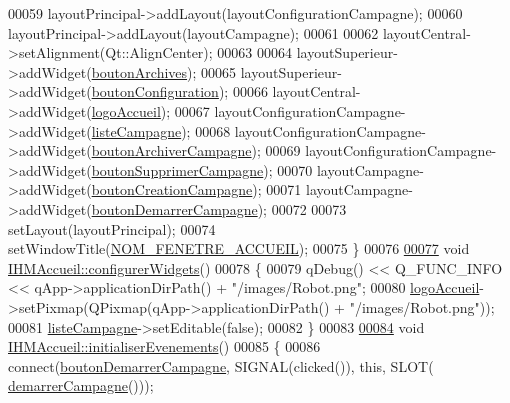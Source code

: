 \begin{DoxyCode}
00059     layoutPrincipal->addLayout(layoutConfigurationCampagne);
00060     layoutPrincipal->addLayout(layoutCampagne);
00061 
00062     layoutCentral->setAlignment(Qt::AlignCenter);
00063 
00064     layoutSuperieur->addWidget(\hyperlink{class_i_h_m_accueil_a313a8c52763aa2978010db77ec6673ac}{boutonArchives});
00065     layoutSuperieur->addWidget(\hyperlink{class_i_h_m_accueil_a8b8ed7d11ab66e3c6895b3c6129dc9c8}{boutonConfiguration});
00066     layoutCentral->addWidget(\hyperlink{class_i_h_m_accueil_a709440124f3307589eee68c517833e6d}{logoAccueil});
00067     layoutConfigurationCampagne->addWidget(\hyperlink{class_i_h_m_accueil_afb828a4e06c25afa40341c310cd85b08}{listeCampagne});
00068     layoutConfigurationCampagne->addWidget(\hyperlink{class_i_h_m_accueil_a96d64cf254c0645eb45c317858b0a0f3}{boutonArchiverCampagne});
00069     layoutConfigurationCampagne->addWidget(\hyperlink{class_i_h_m_accueil_afb409fb4395372f35f9f8699fcb4c89b}{boutonSupprimerCampagne});
00070     layoutCampagne->addWidget(\hyperlink{class_i_h_m_accueil_a4186b4ef6a9c63f5b3c6431626ff3268}{boutonCreationCampagne});
00071     layoutCampagne->addWidget(\hyperlink{class_i_h_m_accueil_a9fd8ab3abc0c1e6addd70c8d7c46fb65}{boutonDemarrerCampagne});
00072 
00073     setLayout(layoutPrincipal);
00074     setWindowTitle(\hyperlink{ihmaccueil_8h_a26ff7f60eb1bfd16fed17fed2d65c865}{NOM\_FENETRE\_ACCUEIL});
00075 \}
00076 
\hyperlink{class_i_h_m_accueil_a63bc796a325066423ed6146b8bab1437}{00077} \textcolor{keywordtype}{void} \hyperlink{class_i_h_m_accueil_a63bc796a325066423ed6146b8bab1437}{IHMAccueil::configurerWidgets}()
00078 \{
00079     qDebug() << Q\_FUNC\_INFO << qApp->applicationDirPath() + \textcolor{stringliteral}{"/images/Robot.png"};
00080     \hyperlink{class_i_h_m_accueil_a709440124f3307589eee68c517833e6d}{logoAccueil}->setPixmap(QPixmap(qApp->applicationDirPath() + \textcolor{stringliteral}{"/images/Robot.png"}));
00081     \hyperlink{class_i_h_m_accueil_afb828a4e06c25afa40341c310cd85b08}{listeCampagne}->setEditable(\textcolor{keyword}{false});
00082 \}
00083 
\hyperlink{class_i_h_m_accueil_a5a571ab8f264c275580501753bb00674}{00084} \textcolor{keywordtype}{void} \hyperlink{class_i_h_m_accueil_a5a571ab8f264c275580501753bb00674}{IHMAccueil::initialiserEvenements}()
00085 \{
00086     connect(\hyperlink{class_i_h_m_accueil_a9fd8ab3abc0c1e6addd70c8d7c46fb65}{boutonDemarrerCampagne}, SIGNAL(clicked()), \textcolor{keyword}{this}, SLOT(
      \hyperlink{class_i_h_m_accueil_a6e8935ff4e0ba8f0c0015f370d91eda3}{demarrerCampagne}()));

\end{DoxyCode}

